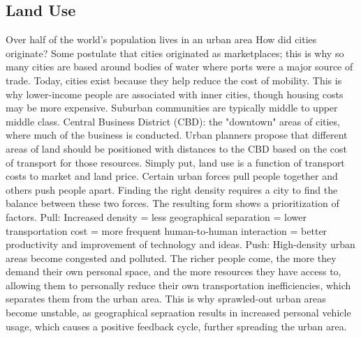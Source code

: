 \documentclass{article}
\begin{document}
    \subsection{Land Use}
    \begin{outline}
        \1 Over half of the world's population lives in an urban area
        \1 How did cities originate?
            \2 Some postulate that cities originated as marketplaces; this is why so many cities are based around bodies of water where ports were a major source of trade. 
        \1 Today, cities exist because they help reduce the cost of mobility. This is why lower-income people are associated with inner cities, though housing costs may be more expensive. Suburban communities are typically middle to upper middle class. 
        \1 Central Business District (CBD): the "downtown" areas of cities, where much of the business is conducted. Urban planners propose that different areas of land should be positioned with distances to the CBD based on the cost of transport for those resources. 
            \2 Simply put, land use is a function of transport costs to market and land price. 
        \1 Certain urban forces pull people together and others push people apart. Finding the right density requires a city to find the balance between these two forces. The resulting form shows a prioritization of factors. 
            \2 Pull: Increased density = less geographical separation = lower transportation cost = more frequent human-to-human interaction = better productivity and improvement of technology and ideas. 
            \2 Push: High-density urban areas become congested and polluted. The richer people come, the more they demand their own personal space, and the more resources they have access to, allowing them to personally reduce their own transportation inefficiencies, which separates them from the urban area. 
        \1 This is why sprawled-out urban areas become unstable, as geographical sepraation results in increased personal vehicle usage, which causes a positive feedback cycle, further spreading the urban area. 
    \end{outline}
\end{document}
